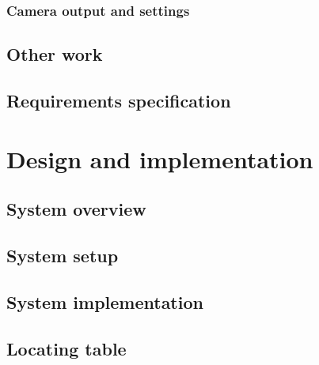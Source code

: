 %			
	
		\subsection{Camera output and settings}
			\label{sec:camera}
			

	
%			
	
		
	\section{Other work}
		\label{sec:otherwork}
		
					
	\section{Requirements specification}
		\label{sec:reqspec}
		

\chapter{Design and implementation}
	\label{solution}
	
	
	\section{System overview}
		\label{sec:sysdesign}
		

	\section{System setup}
		\label{sec:setup}
		
		
	\section{System implementation}
		\label{sec:implementation}
		
		
	\section{Locating table}
		\label{sec:table-locate}
			
		

